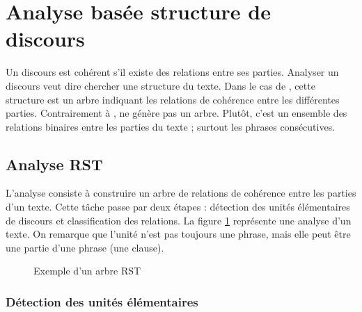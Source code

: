 \documentclass{KodeBook}
\begin{document}



\section{Analyse basée structure de discours}

Un discours est cohérent s'il existe des relations entre ses parties. 
Analyser un discours veut dire chercher une structure du texte.
Dans le cas de , cette structure est un arbre indiquant les relations de cohérence entre les différentes parties. 
Contrairement à ,  ne génère pas un arbre.
Plutôt, c'est un ensemble des relations binaires entre les parties du texte ; surtout les phrases consécutives. 


\subsection{Analyse RST}

L'analyse  consiste à construire un arbre de relations de cohérence entre les parties d'un texte. 
Cette tâche passe par deux étapes : détection des unités élémentaires de discours et classification des relations. 
La figure \ref{fig:rst-exp} représente une analyse  d'un texte.
On remarque que l'unité n'est pas toujours une phrase, mais elle peut être une partie d'une phrase (une clause).

\begin{figure}[!ht]
	\centering
	\caption{Exemple d'un arbre RST}
	\label{fig:rst-exp}
\end{figure}

\subsubsection{Détection des unités élémentaires}
\end{document}
